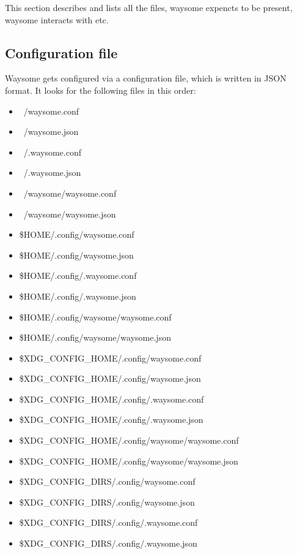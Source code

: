 
This section describes and lists all the files, waysome expencts to be present,
waysome interacts with etc.

\subsection{Configuration file}

    Waysome gets configured via a configuration file, which is written in JSON
    format. It looks for the following files in this order:

    \begin{itemize}
        \item ~/waysome.conf
        \item ~/waysome.json
        \item ~/.waysome.conf
        \item ~/.waysome.json
        \item ~/waysome/waysome.conf
        \item ~/waysome/waysome.json
        \item \$HOME/.config/waysome.conf
        \item \$HOME/.config/waysome.json
        \item \$HOME/.config/.waysome.conf
        \item \$HOME/.config/.waysome.json
        \item \$HOME/.config/waysome/waysome.conf
        \item \$HOME/.config/waysome/waysome.json
        \item \$XDG_CONFIG_HOME/.config/waysome.conf
        \item \$XDG_CONFIG_HOME/.config/waysome.json
        \item \$XDG_CONFIG_HOME/.config/.waysome.conf
        \item \$XDG_CONFIG_HOME/.config/.waysome.json
        \item \$XDG_CONFIG_HOME/.config/waysome/waysome.conf
        \item \$XDG_CONFIG_HOME/.config/waysome/waysome.json
        \item \$XDG_CONFIG_DIRS/.config/waysome.conf
        \item \$XDG_CONFIG_DIRS/.config/waysome.json
        \item \$XDG_CONFIG_DIRS/.config/.waysome.conf
        \item \$XDG_CONFIG_DIRS/.config/.waysome.json

\end{itemize}
